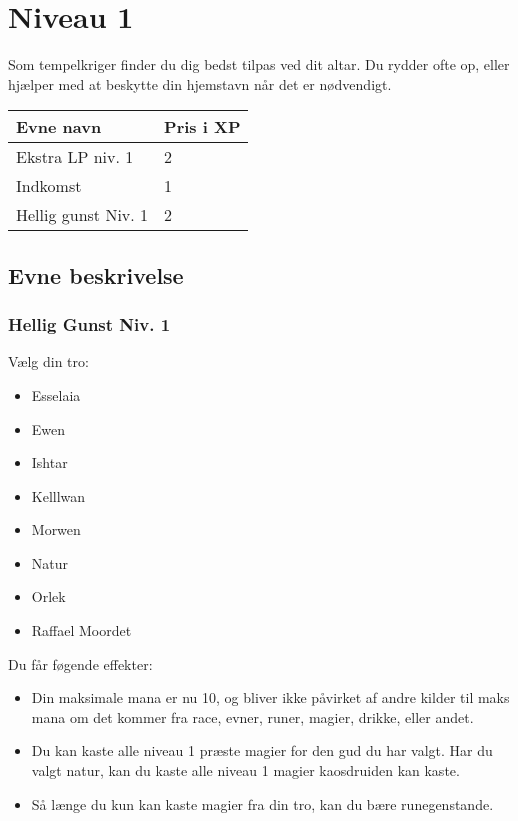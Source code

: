 \chapter{Niveau 1}
Som tempelkriger finder du dig bedst tilpas ved dit altar. Du rydder ofte op, eller hjælper med at beskytte din hjemstavn når det er nødvendigt.

\begin{table}[H]
    \centering
    \begin{tabular}{|p{}|p{}|}
    \rowcolor{cerulean!80}\hline
        Evne navn & Pris i XP \\\hline
        Ekstra LP niv. 1 &2\\\hline 
        Indkomst & 1\\\hline
        Hellig gunst Niv. 1 &2\\\hline
    \end{tabular}
\end{table}

\section{Evne beskrivelse}





\subsection{Hellig Gunst Niv. 1}
Vælg din tro: 
\begin{itemize}
    \item Esselaia
    \item Ewen
    \item Ishtar
    \item Kelllwan
    \item Morwen
    \item Natur
    \item Orlek
    \item Raffael Moordet
\end{itemize}

Du får føgende effekter:
\begin{itemize}
    \item Din maksimale mana er nu 10, og bliver ikke påvirket af andre kilder til maks mana om det kommer fra race, evner, runer, magier, drikke, eller andet.
    \item Du kan kaste alle niveau 1 præste magier for den gud du har valgt. Har du valgt natur, kan du kaste alle niveau 1 magier kaosdruiden kan kaste.
    \item Så længe du kun kan kaste magier fra din tro, kan du bære runegenstande.
\end{itemize}